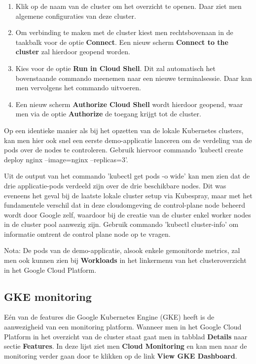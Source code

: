 \begin{enumerate}
\begin{enumerate}
    \end{enumerate}    
    \item Klik op de naam van de cluster om het overzicht te openen. Daar ziet men algemene configuraties van deze cluster.
    \item Om verbinding te maken met de cluster kiest men rechtsbovenaan in de taakbalk voor de optie {\bf Connect}. Een nieuw scherm {\bf Connect to the cluster} zal hierdoor geopend worden.
    \item Kies voor de optie {\bf Run in Cloud Shell}. Dit zal automatisch het bovenstaande commando meenemen naar een nieuwe terminalsessie. Daar kan men vervolgens het commando uitvoeren.
    \item Een nieuw scherm {\bf Authorize Cloud Shell} wordt hierdoor geopend, waar men via de optie {\bf Authorize} de toegang krijgt tot de cluster.   
\end{enumerate} 

Op een identieke manier als bij het opzetten van de lokale Kubernetes clusters, kan men hier ook snel een eerste demo-applicatie lanceren om de verdeling van de pods over de nodes te controleren. Gebruik hiervoor commando 'kubectl create deploy nginx --image=nginx --replicas=3'.

Uit de output van het commando 'kubectl get pods -o wide' kan men zien dat de drie applicatie-pods verdeeld zijn over de drie beschikbare nodes. Dit was eveneens het geval bij de laatste lokale cluster setup via Kubespray, maar met het fundamentele verschil dat in deze cloudomgeving de control-plane node beheerd wordt door Google zelf, waardoor bij de creatie van de cluster enkel worker nodes in de cluster pool aanwezig zijn. Gebruik commando 'kubectl cluster-info' om informatie omtrent de control plane node op te vragen. 

Nota: De pods van de demo-applicatie, alsook enkele gemonitorde metrics, zal men ook kunnen zien bij {\bf Workloads} in het linkermenu van het clusteroverzicht in het Google Cloud Platform. 

\subsection{GKE monitoring}

Eén van de features die Google Kubernetes Engine (GKE) heeft is de aanwezigheid van een monitoring platform. Wanneer men in het Google Cloud Platform in het overzicht van de cluster staat gaat men in tabblad {\bf Details} naar sectie {\bf Features}. In deze lijst ziet men {\bf Cloud Monitoring } en kan men naar de monitoring verder gaan door te klikken op de link {\bf View GKE Dashboard}.

